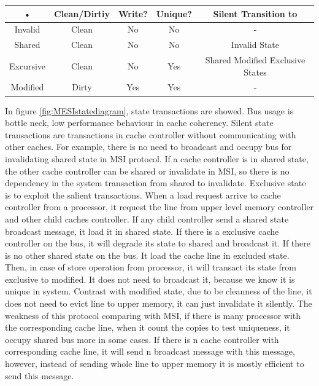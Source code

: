 \documentclass[informationsecurity]{gucmasterproject}
\begin{document}
\begin{tabular}{|c|c|c|c|c|}
\hline 
• & Clean/Dirtiy & Write? & Unique? & Silent Transition to \\ 
\hline 
Invalid & Clean & No & No & - \\ 
\hline 
Shared & Clean & No & No & Invalid State \\ 
\hline 
Excursive & Clean & No & Yes & Shared Modified Exclusive States \\ 
\hline 
Modified & Dirty & Yes & Yes & - \\ 
\hline 
\end{tabular} 

In figure \ref{fig:MESIstatediagram}, state transactions are showed. Bus usage is bottle neck, low performance behaviour in cache coherency. Silent state transactions are transactions in cache controller without communicating with other caches. For example, there is no need to broadcast and occupy bus for invalidating shared state in MSI protocol. If a cache controller is in shared state, the other cache controller can be shared or invalidate in MSI, so there is no dependency in the system transaction from shared to invalidate. Exclusive state is to exploit the salient transactions. When a load request arrive to cache controller from a processor, it request the line from upper level memory controller and other child caches controller. If any child controller send a shared state broadcast message, it load it in shared state. If there is a exclusive cache controller on the bus, it will degrade its state to shared and broadcast it. If there is no other shared state on the bus. It load the cache line in excluded state. Then, in case of store operation from processor, it will transact its state from exclusive to modified. It does not need to broadcast it, because we know it is unique in system. Contrast with modified state, due to be cleanness of the line, it does not need to evict line to upper memory, it can  just invalidate it silently. The weakness of this protocol comparing with MSI, if there is many processor with the corresponding cache line, when it count the copies to test uniqueness, it occupy shared bus more in some cases. If there is n cache controller with corresponding cache line, it will send n broadcast message with this message, however, instead of sending whole line to upper memory it is mostly efficient to send this message.
\end{document}
